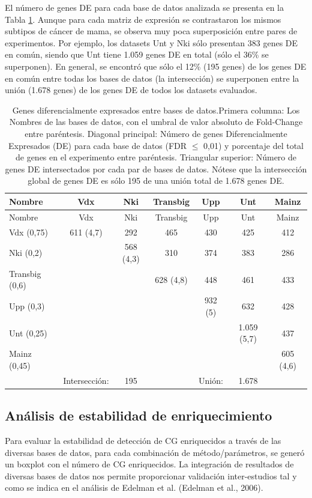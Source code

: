 \documentclass[12pt,twoside]{reedthesis}
\begin{document}
El número de genes DE para cada base de datos analizada se presenta en la Tabla \ref{tab:deGenes}. Aunque para cada matriz de expresión se contrastaron los mismos subtipos de cáncer de mama, se observa muy poca superposición entre pares de experimentos. Por ejemplo, los datasets Unt y Nki sólo presentan 383 genes DE en común, siendo que Unt tiene 1.059 genes DE en total (sólo el 36\% se superponen). En general, se encontró que sólo el 12\% (195 genes) de los genes DE en común entre todas los bases de datos (la intersección) se superponen entre la unión (1.678 genes) de los genes DE de todos los datasets evaluados.
\begin{longtable}[]{@{}lcccccc@{}}
\caption{Genes diferencialmente expresados entre bases de datos.\label{tab:deGenes}
Primera columna: Los Nombres de las bases de datos, con el umbral de valor absoluto de Fold-Change entre paréntesis. Diagonal principal: Número de genes Diferencialmente Expresados (DE) para cada base de datos (FDR \(\leq\) 0,01) y porcentaje del total de genes en el experimento entre paréntesis. Triangular superior: Número de genes DE intersectados por cada par de bases de datos. Nótese que la intersección global de genes DE es sólo 195 de una unión total de 1.678 genes DE.}\tabularnewline
\toprule
Nombre & Vdx & Nki & Transbig & Upp & Unt & Mainz\tabularnewline
\midrule
\endfirsthead
\toprule
Nombre & Vdx & Nki & Transbig & Upp & Unt & Mainz\tabularnewline
\midrule
\endhead
Vdx (0,75) & 611 (4,7) & 292 & 465 & 430 & 425 & 412\tabularnewline
Nki (0,2) & & 568 (4,3) & 310 & 374 & 383 & 286\tabularnewline
Transbig (0,6) & & & 628 (4,8) & 448 & 461 & 433\tabularnewline
Upp (0,3) & & & & 932 (5) & 632 & 428\tabularnewline
Unt (0,25) & & & & & 1.059 (5,7) & 437\tabularnewline
Mainz (0,45) & & & & & & 605 (4,6)\tabularnewline
& Intersección: & 195 & & Unión: & 1.678 &\tabularnewline
\bottomrule
\end{longtable}
\hypertarget{anuxe1lisis-de-estabilidad-de-enriquecimiento}{%
\subsection{Análisis de estabilidad de enriquecimiento}\label{anuxe1lisis-de-estabilidad-de-enriquecimiento}}

\par

Para evaluar la estabilidad de detección de CG enriquecidos a través de las diversas bases de datos, para cada combinación de método/parámetros, se generó un boxplot con el número de CG enriquecidos. La integración de resultados de diversas bases de datos nos permite proporcionar validación inter-estudios tal y como se indica en el análisis de Edelman et al. (Edelman et al., 2006).
\end{document}
